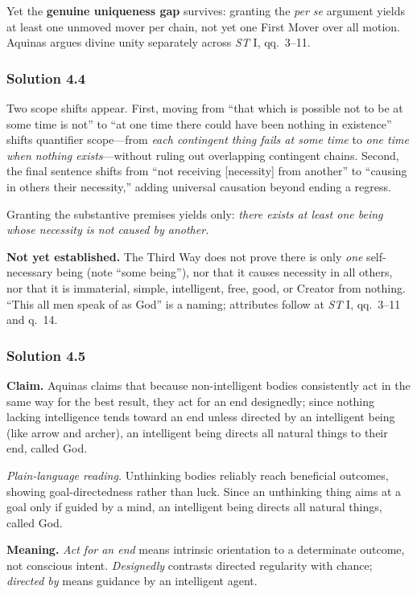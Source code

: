 Yet the \textbf{genuine uniqueness gap} survives: granting the \emph{per se} argument yields at least one unmoved mover per chain, not yet one First Mover over all motion. Aquinas argues divine unity separately across \emph{ST} I, qq.\ 3--11.

\subsubsection*{Solution 4.4}

Two scope shifts appear. First, moving from ``that which is possible not to be at some time is not'' to ``at one time there could have been nothing in existence'' shifts quantifier scope---from \emph{each contingent thing fails at some time} to \emph{one time when nothing exists}---without ruling out overlapping contingent chains. Second, the final sentence shifts from ``not receiving [necessity] from another'' to ``causing in others their necessity,'' adding universal causation beyond ending a regress.

Granting the substantive premises yields only: \emph{there exists at least one being whose necessity is not caused by another.}

\textbf{Not yet established.} The Third Way does not prove there is only \emph{one} self-necessary being (note ``some being''), nor that it causes necessity in all others, nor that it is immaterial, simple, intelligent, free, good, or Creator from nothing. ``This all men speak of as God'' is a naming; attributes follow at \emph{ST} I, qq.\ 3--11 and q.\ 14.

\subsubsection*{Solution 4.5}

\textbf{Claim.} Aquinas claims that because non-intelligent bodies consistently act in the same way for the best result, they act for an end designedly; since nothing lacking intelligence tends toward an end unless directed by an intelligent being (like arrow and archer), an intelligent being directs all natural things to their end, called God.

\emph{Plain-language reading.} Unthinking bodies reliably reach beneficial outcomes, showing goal-directedness rather than luck. Since an unthinking thing aims at a goal only if guided by a mind, an intelligent being directs all natural things, called God.

\textbf{Meaning.} \emph{Act for an end} means intrinsic orientation to a determinate outcome, not conscious intent. \emph{Designedly} contrasts directed regularity with chance; \emph{directed by} means guidance by an intelligent agent.

